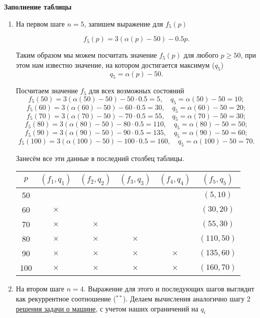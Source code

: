 \bigskip

\textbf{Заполнение таблицы}

\begin{enumerate}[nosep]
	\item[\fbox{Шаг 1}] На первом шаге $n = 5$, запишем выражение для $f_5(p)$
	
	\[
	f_5(p) = 3(\alpha(p) - 50) - 0.5p.
	\]
	
	Таким образом мы можем посчитать значение $f_5(p)$ для любого $p \ge 50$, при этом нам известно значение, на котором достигается максимум ($q_5$)
	\[
	q_5 = \alpha(p) - 50.
	\]
	
	Посчитаем значение $f_5$ для всех возможных состояний
	\[
	f_5(50) = 3(\alpha(50) - 50) - 50\cdot0.5 = 5, \quad q_5 = \alpha(50) - 50 = 10;
	\]
	\[
	f_5(60) = 3(\alpha(60) - 50) - 60\cdot0.5 = 30, \quad q_5 = \alpha(60) - 50 = 20;
	\]
	\[
	f_5(70) = 3(\alpha(70) - 50) - 70\cdot0.5 = 55, \quad q_5 = \alpha(70) - 50 = 30;
	\]
	\[
	f_5(80) = 3(\alpha(80) - 50) - 80\cdot0.5 = 110, \quad q_5 = \alpha(80) - 50 = 50;
	\]
	\[
	f_5(90) = 3(\alpha(90) - 50) - 90\cdot0.5 = 135, \quad q_5 = \alpha(90) - 50 = 60;
	\]
	\[
	f_5(100) = 3(\alpha(100) - 50) - 100\cdot0.5 = 160, \quad q_5 = \alpha(100) - 50 = 70.
	\]
	
	Занесём все эти данные в последний столбец таблицы.
	
	\begin{table}[H]
		\centering
		\begin{tabular}{ | c | c | c | c | c | c | } 
			\hline
			$p$ & $(f_1, q_1)$ & $(f_2, q_2)$ & $(f_3, q_3)$ & $(f_4, q_4)$ & $(f_5, q_5)$ \\ 
			\hline
			50 & & & & & $(5, 10)$ \\\hline
			60 & $\times$ & & & & $(30, 20)$ \\\hline
			70 & $\times$ & $\times$ & & & $(55, 30)$ \\\hline
			80 & $\times$ & $\times$ & $\times$ & & $(110, 50)$ \\\hline
			90 & $\times$ & $\times$ & $\times$ & $\times$ & $(135, 60)$ \\\hline
			100 & $\times$ & $\times$ & $\times$ & $\times$ & $(160, 70)$ \\\hline
		\end{tabular}
	\end{table}
		
	\item[\fbox{Шаг 2}] 
	На втором шаге $n = 4$. Выражение для этого и последующих шагов выглядит как рекуррентное соотношение ($^{**}$). Делаем вычисления аналогично шагу 2 \hyperref[pr:car_on_island]{решения задачи о машине}, с учетом наших ограничений на $q_i$
	

\end{enumerate}
